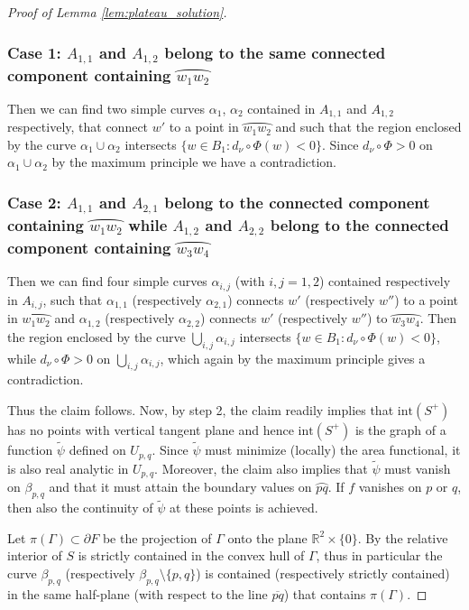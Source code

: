 \documentclass[JEP,XML,SOM,Unicode, NoFloatCountersInSection,published]{cedram}
\newcommand{\R}{\mathbb{R}}
\let\arc\wideparen
\theoremstyle{definition}
\begin{document}
\begin{proof}[Proof of Lemma \ref{lem:plateau_solution}]
\subsubsection*{Case 1: $A_{1,1}$ and $A_{1,2}$ belong to the same connected component containing $\arc{w_1w_2}$}
Then we can find two simple curves $\alpha_1$, $\alpha_2$ contained in $A_{1,1}$ and $A_{1,2}$ respectively, that connect $w'$ to a point in $\arc{w_1w_2}$ and such that the region enclosed by the curve $\alpha_1\cup\alpha_2$ intersects $\{w\in B_1\colon d_\nu\circ\Phi(w)<0\}$. Since $d_\nu\circ \Phi>0$ on $\alpha_1\cup\alpha_2$ by the maximum principle we have a contradiction.

\subsubsection*{Case 2: $A_{1,1}$ and $A_{2,1}$ belong to the connected component containing $\arc{w_1w_2}$ while $A_{1,2}$ and $A_{2,2}$ belong to the connected component containing $\arc{w_3w_4}$}
Then we can find four simple curves $\alpha_{i,j}$ (with $i,j=1,2$) contained respectively in $A_{i,j}$, such that $\alpha_{1,1}$ (respectively $\alpha_{2,1}$) connects $w'$ (respectively $w''$) to a point in $\arc{w_1w_2}$ and $\alpha_{1,2}$ (respectively $\alpha_{2,2}$) connects $w'$ (respectively $w''$) to $\arc{w_3w_4}$. Then the region enclosed by the curve $\bigcup_{i,j}\alpha_{i,j}$ intersects $\{w\in B_1\colon d_\nu\circ\Phi(w)<0\}$, while $d_\nu\circ\Phi>0$ on $\bigcup_{i,j}\alpha_{i,j}$, which again by the maximum principle gives a contradiction.

\smallskip
Thus the claim follows. { Now, by step 2, the claim readily implies that $\mathrm{int}(S^+)$ has no points with vertical tangent plane and hence $\mathrm{int}(S^+)$ is the graph of a function $\widetilde\psi$ defined on ${U_{p,q}}$. Since $\widetilde \psi$ must minimize (locally) the area functional, it is also real analytic in $U_{p,q}$. Moreover, the claim also implies that $\widetilde\psi$ must vanish on $\beta_{p,q}$ and that it must attain the boundary values on $\arc{pq}$. If $f$ vanishes on $p$ or $q$, then also the continuity of $\widetilde\psi$ at these points is achieved. }

Let $\pi(\Gamma)\subset\partial F$ be the projection of $\Gamma$ onto the plane $\R^2\times\{0\}$. By \cite[Th.\,3, p.\,343]{DHS} the relative interior of $S$ is strictly contained in the convex hull of $\Gamma$, thus in particular
the curve $\beta_{p,q}$ (respectively $\beta_{p,q}\setminus\{p,q\}$) is contained (respectively strictly contained) in the same half-plane (with respect to the line $\overline{pq}$) that contains $\pi(\Gamma)$.


\end{proof}
\end{document}

